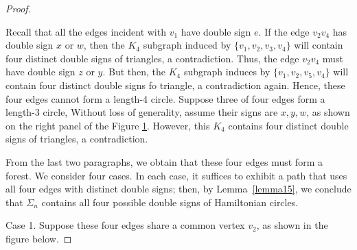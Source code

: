\documentclass[12pt]{amsart}
\theoremstyle{plain}
\theoremstyle{definition}%
\begin{document}
\begin{proof}
\begin{figure}[H]

 \caption{}
 \label{four1}
\end{figure}
\vspace{-6pt}

Recall that all the edges incident with $v_1$ have double sign $e$.  If the edge $v_2v_4$ has double sign $x$ or $w$, then the $K_4$ subgraph induced by $\{v_1,v_2,v_3,v_4\}$ will contain four distinct double signs of triangles, a contradiction. Thus, the edge $v_2v_4$ must have double sign $z$ or $y$. But then, the $K_4$ subgraph induces by $\{v_1,v_2,v_5,v_4\}$ will contain four distinct double signs fo triangle, a contradiction again.  Hence, these four edges cannot form a length-4 circle. Suppose three of four edges form a length-3 circle, Without loss of generality, assume their signs are $x,y,w$, as shown on the right panel of the Figure \ref{four1}. However, this $K_4$ contains four distinct double signs of triangles, a contradiction.


From the last two paragraphs, we obtain that these four edges must form a forest. We consider four cases. In each case, it suffices to exhibit a path that uses all four edges with distinct double signs; then, by Lemma~\ref{lemma15}, we conclude that $\Sigma_n$ contains all four possible double signs of Hamiltonian circles.







     
     
     
    
     
Case 1. Suppose these four edges share a common vertex $v_2$, as shown in the figure below. 


\end{proof}
\end{document}
